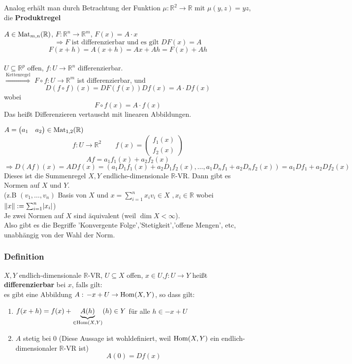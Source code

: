 Analog erhält man durch Betrachtung der Funktion $\mu : \mathbb{R}^2 \to  \mathbb{R}$ mit $\mu(y,z)=yz$, die {\bfseries Produktregel}

$A \in \operatorname{Mat}_{m,n}(\mathbb{R})$, $F: \mathbb{R}^n \to \mathbb{R}^m$, $F(x)=A \cdot x$
\[
	\Rightarrow F \text{ ist differenzierbar und es gilt } DF(x)=A
\]
\[
	F(x+h)=A(x+h)=Ax+Ah=F(x)+Ah
\] \bewende \\
$U \subseteq \mathbb{R}^p$ offen, $f: U \to \mathbb{R}^n$ differenzierbar. \\
$\stackrel{\text{Kettenregel}}{\Rightarrow}$ $F \circ f: U \to \mathbb{R}^m$ ist differenzierbar, und 
\[
	D(f \circ f)(x)= DF(f(x))Df(x) = A \cdot Df(x)
\]
wobei
\[
	F \circ f(x)=A \cdot f(x)
\]
Das heißt Differenzieren vertauscht mit linearen Abbildungen.

$A= \begin{pmatrix}
	a_1 & a_2
\end{pmatrix} \in \operatorname{Mat}_{1,2}(\mathbb{R})$
\[
	f: U \to \mathbb{R}^2 \qquad f(x)= \begin{pmatrix}
		f_1(x) \\ f_2(x)
	\end{pmatrix}
\]
\[
	Af=a_1f_1(x)+a_2f_2(x)
\]
\[
	\Rightarrow D(Af)(x)= A Df(x) = (a_1D_1f_1(x) + a_2D_1f_2(x), \dots, a_1D_nf_1 + a_2D_nf_2(x)) = a_1Df_1 + a_2Df_2(x) 
\]
Dieses ist die Summenregel
$X,Y$ endliche-dimensionale $\mathbb{R}$-VR. Dann gibt es Normen auf $X$ und $Y$. \\
(z.B $(v_1, \dots , v_n)$ Basis von $X$ und $x = \sum^{n}_{i=1}x_iv_i \in X \,\,,x_i \in \mathbb{R}$ wobei $\norm{x}:= \sum^{n}_{i=1}\abs{x_i}$) \\
Je zwei Normen auf $X$ sind äquivalent (weil $\dim X < \infty$). \\
Also gibt es die Begriffe 'Konvergente Folge','Stetigkeit','offene Mengen', etc, unabhängig von der Wahl der Norm.

\subsubsection{Definition} %
\label{ssub:definition}
$X,Y$ endlich-dimensionale $\mathbb{R}$-VR, $U \subseteq X$ offen, $x \in U$,$f: U \to Y$ heißt {\bfseries differenzierbar} bei $x$, falls gilt: \\
es gibt eine Abbildung $A: \,-x+U \to \operatorname{Hom}(X,Y)$, so dass gilt:
\begin{enumerate}
	\item $f(x+h)=f(x)+\underset{\in \operatorname{Hom}(X,Y)}{\underbrace{A(h)}}(h) \in Y$ für alle $h \in -x+U$
	\item $A$ stetig bei $0$ (Diese Aussage ist wohldefiniert, weil $\operatorname{Hom}(X,Y)$ ein endlich-dimensionaler $\mathbb{R}$-VR ist)
	\[
		A(0)=Df(x)
	\]
\end{enumerate}
